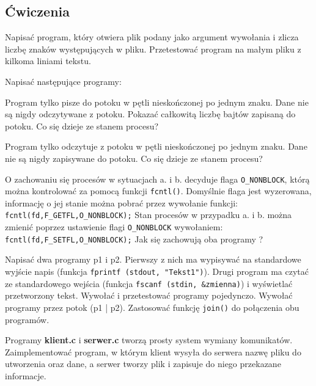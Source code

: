 \subsection{Ćwiczenia}
\label{sec:T9O59}

\begin{myenumerate}
  \item Napisać program, który otwiera plik podany jako argument wywołania i
    zlicza liczbę znaków występujących w pliku. Przetestować program na małym
    pliku z kilkoma liniami tekstu. 
  \item Napisać następujące programy:
    \begin{myenumerate}
      \item Program tylko pisze do potoku w pętli nieskończonej po jednym
        znaku. Dane nie są nigdy odczytywane z potoku. Pokazać całkowitą liczbę
        bajtów zapisaną do potoku. Co się dzieje ze stanem procesu?
      \item Program tylko odczytuje z potoku w pętli nieskończonej po jednym
        znaku. Dane nie są nigdy zapisywane do potoku. Co się dzieje ze stanem
        procesu?
      \item O zachowaniu się procesów w sytuacjach a. i b. decyduje flaga
        \texttt{O\_NONBLOCK}, którą można kontrolować za pomocą funkcji
        \texttt{fcntl()}. Domyślnie flaga jest wyzerowana, informację o jej
        stanie można pobrać przez wywołanie funkcji:
        \texttt{fcntl(fd,F\_GETFL,O\_NONBLOCK);} Stan procesów w przypadku a. i
        b. można zmienić poprzez ustawienie flagi \texttt{O\_NONBLOCK}
        wywołaniem: \texttt{fcntl(fd,F\_SETFL,O\_NONBLOCK);} Jak się
        zachowują oba programy ? 
    \end{myenumerate}
    \item Napisać dwa programy p1 i p2. Pierwszy z nich ma wypisywać na
      standardowe wyjście napis (funkcja \texttt{fprintf (stdout, "Tekst1")}).
      Drugi program ma czytać ze standardowego wejścia (funkcja \texttt{fscanf
      (stdin, \&zmienna)}) i wyświetlać przetworzony tekst. Wywołać i przetestować
      programy pojedynczo. Wywołać programy przez potok (p1 | p2). Zastosować
      funkcję \texttt{join()} do połączenia obu programów. 
    \item Programy \textbf{klient.c} i \textbf{serwer.c} tworzą prosty system
      wymiany komunikatów. Zaimplementować program, w którym klient wysyła do
      serwera nazwę pliku do utworzenia oraz dane, a serwer tworzy plik i
      zapisuje do niego przekazane informacje.
\end{myenumerate}

